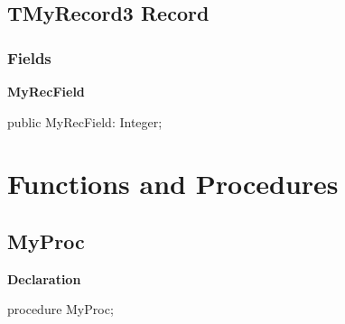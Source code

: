 \documentclass{report}
\newif\ifpdf
\begin{document}
\subsection*{TMyRecord3 Record}
\fi
\label{ok_nodescription_printing.TMyRecord3}
\subsubsection*{\large{\textbf{Fields}}\normalsize\hspace{1ex}\hfill}
\begin{list}{}{
\setlength{\itemindent}{0cm}
\setlength{\listparindent}{0cm}
\setlength{\leftmargin}{\evensidemargin}
\addtolength{\leftmargin}{\tmplength}
\settowidth{\labelsep}{X}
\addtolength{\leftmargin}{\labelsep}
\setlength{\labelwidth}{\tmplength}
}
\label{ok_nodescription_printing.TMyRecord3-MyRecField}
\item[\textbf{MyRecField}\hfill]
\ifpdf
\begin{flushleft}
\fi
\begin{ttfamily}
public MyRecField: Integer;\end{ttfamily}

\ifpdf
\end{flushleft}
\fi


\par  \end{list}
\section{Functions and Procedures}
\ifpdf
\subsection*{\large{\textbf{MyProc}}\normalsize\hspace{1ex}\hrulefill}
\else
\subsection*{MyProc}
\fi
\label{ok_nodescription_printing-MyProc}
\begin{list}{}{
\setlength{\itemindent}{0cm}
\setlength{\listparindent}{0cm}
\setlength{\leftmargin}{\evensidemargin}
\addtolength{\leftmargin}{\tmplength}
\settowidth{\labelsep}{X}
\addtolength{\leftmargin}{\labelsep}
\setlength{\labelwidth}{\tmplength}
}
\item[\textbf{Declaration}\hfill]
\ifpdf
\begin{flushleft}
\fi
\begin{ttfamily}
procedure MyProc;\end{ttfamily}

\ifpdf
\end{flushleft}
\fi

\end{list}
\end{document}
